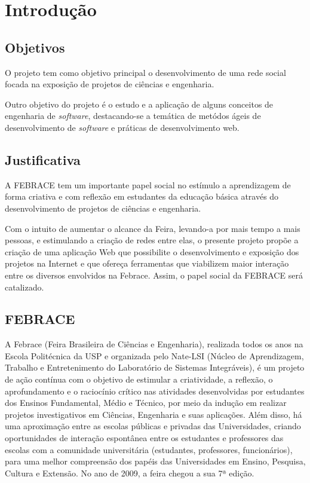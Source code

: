 
\chapter{Introdução}

  \section{Objetivos}
    O projeto tem como objetivo principal o desenvolvimento de uma rede social focada na exposição de projetos de ciências e engenharia. 

    Outro objetivo do projeto é o estudo e a aplicação de alguns conceitos de engenharia de \textit{software}, destacando-se a temática de metódos ágeis de desenvolvimento de \textit{software} e práticas de desenvolvimento web.

  \section{Justificativa}
    A FEBRACE tem um importante papel social no estímulo a aprendizagem de forma criativa e com reflexão em estudantes da educação básica através do desenvolvimento de projetos de ciências e engenharia.

  Com o intuito de aumentar o alcance da Feira, levando-a por mais tempo a mais pessoas, e estimulando a criação de redes entre elas, o presente projeto propõe a criação de uma aplicação Web que possibilite o desenvolvimento e exposição dos projetos na Internet e que ofereça ferramentas que viabilizem maior interação entre os diversos envolvidos na Febrace. Assim, o papel social da FEBRACE será catalizado.

  \section{FEBRACE}

  A Febrace (Feira Brasileira de Ciências e Engenharia), realizada todos os anos na Escola Politécnica da USP e organizada pelo Nate-LSI (Núcleo de Aprendizagem, Trabalho e Entretenimento do Laboratório de Sistemas Integráveis), é um projeto de ação contínua com o objetivo de estimular a criatividade, a reflexão, o aprofundamento e o raciocínio crítico nas atividades desenvolvidas por estudantes dos Ensinos Fundamental, Médio e Técnico, por meio da indução em realizar projetos investigativos em Ciências, Engenharia e suas aplicações\cite{lopes07}. Além disso, há uma aproximação entre as escolas públicas e privadas das Universidades, criando oportunidades de interação espontânea entre os estudantes e professores das escolas com a comunidade universitária (estudantes, professores, funcionários), para uma melhor compreensão dos papéis das Universidades em Ensino, Pesquisa, Cultura e Extensão. No ano de 2009, a feira chegou a sua 7ª edição.

